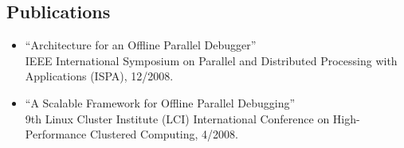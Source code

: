 \documentclass[10pt,letterpaper]{article}
\begin{document}
\subsection*{Publications}

\begin{itemize}

	\item ``Architecture for an Offline Parallel Debugger'' \\
	IEEE International Symposium on Parallel and Distributed Processing
	with Applications (ISPA), 12/2008.


	\item ``A Scalable Framework for Offline Parallel Debugging'' \\
	9th Linux Cluster Institute (LCI) International Conference on
	High-Performance Clustered Computing, 4/2008.

\end{itemize}
\end{document}
